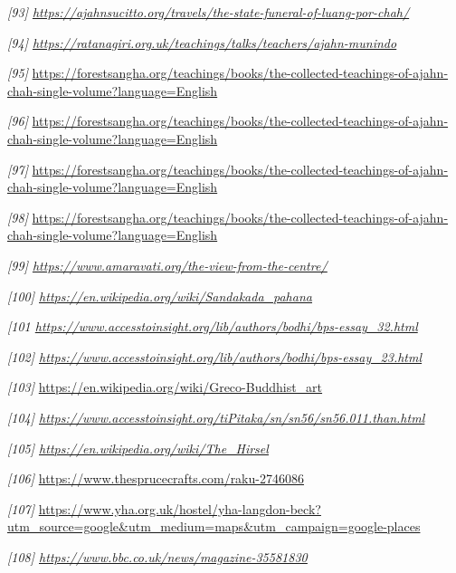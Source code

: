 \emph{{[}93{]}
\href{https://ajahnsucitto.org/travels/the-state-funeral-of-luang-por-chah/}{\underline{https://ajahnsucitto.org/travels/the-state-funeral-of-luang-por-chah/}}}

\emph{{[}94{]}
\href{https://ratanagiri.org.uk/teachings/talks/teachers/ajahn-munindo}{\underline{https://ratanagiri.org.uk/teachings/talks/teachers/ajahn-munindo}}}

\emph{{[}95{]}}
\url{https://forestsangha.org/teachings/books/the-collected-teachings-of-ajahn-chah-single-volume?language=English}

\emph{{[}96{]}}
\url{https://forestsangha.org/teachings/books/the-collected-teachings-of-ajahn-chah-single-volume?language=English}

\emph{{[}97{]}}
\url{https://forestsangha.org/teachings/books/the-collected-teachings-of-ajahn-chah-single-volume?language=English}

\emph{{[}98{]}}
\url{https://forestsangha.org/teachings/books/the-collected-teachings-of-ajahn-chah-single-volume?language=English}

\emph{{[}99{]}
\href{https://www.amaravati.org/the-view-from-the-centre/}{\underline{https://www.amaravati.org/the-view-from-the-centre/}}}

\emph{{[}100{]}
\href{https://en.wikipedia.org/wiki/Sandakada_pahana}{\underline{https://en.wikipedia.org/wiki/Sandakada\_pahana}}}

\emph{{[}101
\underline{https://www.accesstoinsight.org/lib/authors/bodhi/bps-essay\_32.html}}

\emph{{[}102{]}
\href{https://www.accesstoinsight.org/lib/authors/bodhi/bps-essay_23.html}{\underline{https://www.accesstoinsight.org/lib/authors/bodhi/bps-essay\_23.html}}}

\emph{{[}103{]}} \url{https://en.wikipedia.org/wiki/Greco-Buddhist_art}

\emph{{[}104{]}
\href{https://www.accesstoinsight.org/tipitaka/sn/sn56/sn56.011.than.html}{\underline{https://www.accesstoinsight.org/tiPitaka/sn/sn56/sn56.011.than.html}}}

\emph{{[}105{]}
\href{https://en.wikipedia.org/wiki/The_Hirsel}{\underline{https://en.wikipedia.org/wiki/The\_Hirsel}}}

\emph{{[}106{]}} \url{https://www.thesprucecrafts.com/raku-2746086}

\emph{{[}107{]}}
\url{https://www.yha.org.uk/hostel/yha-langdon-beck?utm_source=google\&utm_medium=maps\&utm_campaign=google-places}

\emph{{[}108{]}
\href{https://www.bbc.co.uk/news/magazine-35581830}{\underline{https://www.bbc.co.uk/news/magazine-35581830}}}

